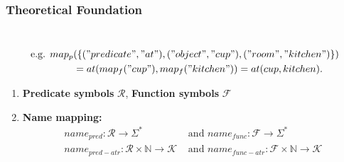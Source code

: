 \begin{frame}
  \frametitle{Theoretical Foundation}
    \begin{description}[]
  \item[Mapping into PDDL] \hfill \\
\vspace{-0.5cm}
\small\begin{align*}
\text{e.g. } map_p&(\{("predicate", "at"),("object", "cup"),("room","kitchen")\})\\
             &= at(map_f("cup"), map_f("kitchen")) = at(cup, kitchen) \text{.}
\end{align*}
  \begin{enumerate}
      \item \textbf{Predicate symbols} $\mathcal{R}$, \textbf{Function symbols} $\mathcal{F}$
      \item \textbf{Name mapping:}
      \begin{align*}
        name_{pred}: \mathcal{R} \rightarrow \Sigma^* &\text{ and } name_{func}: \mathcal{F} \rightarrow \Sigma^*\\
        name_{pred-atr}: \mathcal{R} \times \mathbb{N} \rightarrow \mathcal{K} &\text{ and } name_{func-atr}: \mathcal{F} \times \mathbb{N} \rightarrow
\mathcal{K}
      \end{align*}
    \end{enumerate}
  \end{description}
\end{frame}

